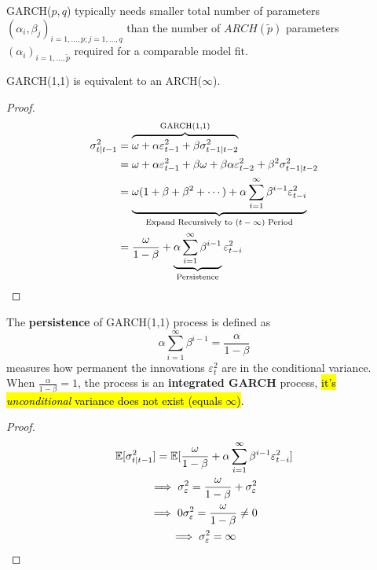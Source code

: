 \documentclass[11pt]{article}
\begin{document}
            \begin{remark}
                GARCH($p,q$) typically needs smaller total number of parameters $(\alpha_i, \beta_j)_{i=1,\dots,p; j=1,\dots,q}$ than the number of $ARCH(\tilde{p})$ parameters $(\alpha_i)_{i=1,\dots,\tilde{p}}$ required for a comparable model fit.
            \end{remark}
            
            \begin{proposition}
                GARCH(1,1) is equivalent to an ARCH($\infty$).
                \begin{proof}
                    \begin{align}
                        \sigma_{t|t-1}^2 &= \overbrace{\omega + \alpha \varepsilon_{t-1}^2 + \beta \sigma_{t-1|t-2}^2}^{\text{{GARCH(1,1)}}} \\
                        &= \omega + \alpha \varepsilon_{t-1}^2 + \beta \omega + \beta \alpha \varepsilon_{t-2}^2 + \beta^2 \sigma_{t-1|t-2}^2 \\
                        &= \underbrace{\omega(1 + \beta + \beta^2 + \cdots) + \alpha \sum_{i=1}^\infty \beta^{i-1} \varepsilon_{t-i}^2}_{\text{{Expand Recursively to $(t-\infty)$ Period}}} \\
                        &= \frac{\omega}{1 - \beta} + \underbrace{\alpha \sum_{i=1}^\infty \beta^{i-1}}_{\text{{Persistence}}} \varepsilon_{t-i}^2
                    \end{align}
                \end{proof}
            \end{proposition}
            
            \begin{definition}
                The \textbf{persistence} of GARCH(1,1) process is defined as
                \begin{equation}
                    \alpha \sum_{i=1}^\infty \beta^{i-1} = \frac{\alpha}{1 - \beta}
                \end{equation}
                measures how permanent the innovations $\varepsilon_t^2$ are in the conditional variance. When $\frac{\alpha}{1 - \beta} = 1$, the process is an \textbf{integrated GARCH} process, \hl{it's \emph{unconditional} variance does not exist (equals $\infty$)}.
                \begin{proof}
                    \begin{gather}
                        \mathbb{E}[{\sigma_{t|t-1}^2}] = \mathbb{E}[{\frac{\omega}{1 - \beta} + \alpha \sum_{i=1}^\infty \beta^{i-1} \varepsilon_{t-i}^2}] \\
                        \implies \sigma^2_\varepsilon = \frac{\omega}{1 - \beta} + \sigma^2_\varepsilon \\
                        \implies 0 \sigma_\varepsilon^2 = \frac{\omega}{1-\beta} \neq 0 \\
                        \implies \sigma_\varepsilon^2 = \infty
                    \end{gather}
                \end{proof}
            \end{definition}
	        
\end{document}
